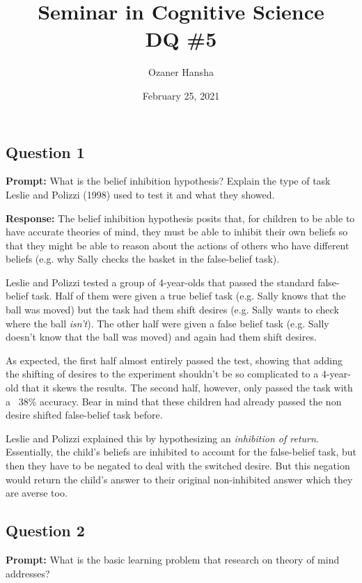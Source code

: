 \documentclass{article}
\begin{document}
\title{Seminar in Cognitive Science\\ DQ \#5}
\author{Ozaner Hansha}
\date{February 25, 2021}
\maketitle

\subsection*{Question 1}
\noindent\textbf{Prompt:} What is the belief inhibition hypothesis? Explain the type of task Leslie and Polizzi (1998) used to test it and what they showed.
\bigskip

\noindent\textbf{Response:} The belief inhibition hypothesis posits that, for children to be able to have accurate theories of mind, they must be able to inhibit their own beliefs so that they might be able to reason about the actions of others who have different beliefs (e.g. why Sally checks the basket in the false-belief task).

Leslie and Polizzi tested a group of 4-year-olds that passed the standard false-belief task. Half of them were given a true belief task (e.g. Sally knows that the ball was moved) but the task had them shift desires (e.g. Sally wants to check where the ball \textit{isn't}). The other half were given a false belief task (e.g. Sally doesn't know that the ball was moved) and again had them shift desires.

As expected, the first half almost entirely passed the test, showing that adding the shifting of desires to the experiment shouldn't be so complicated to a 4-year-old that it skews the results. The second half, however, only passed the task with a ~38\% accuracy. Bear in mind that these children had already passed the non desire shifted false-belief task before.

Leslie and Polizzi explained this by hypothesizing an \textit{inhibition of return}. Essentially, the child's beliefs are inhibited to account for the false-belief task, but then they have to be negated to deal with the switched desire. But this negation would return the child's answer to their original non-inhibited answer which they are averse too.

\subsection*{Question 2}
\noindent\textbf{Prompt:} What is the basic learning problem that research on theory of mind addresses?
\bigskip
\end{document}
